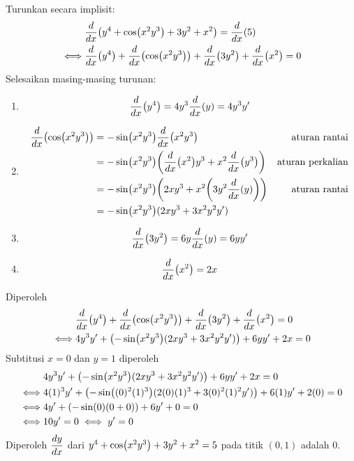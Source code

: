 \begin{enumerate}[leftmargin=*, label={\arabic*}.]
\begin{enumerate}[label={\alph*}.]
    Turunkan secara implisit:
    \begin{align*}
        &\drv{x}{y^{4}+\cos\brk*{x^{2}y^{3}}+3y^{2}+x^{2}}=\drv{x}{5}\\
        \iff &\drv{x}{y^{4}}+\drv{x}{\cos\brk*{x^{2}y^{3}}}
        +\drv{x}{3y^{2}}+\drv{x}{x^{2}} = 0
    \end{align*}
    Selesaikan masing-masing turunan:
        \begin{enumerate}[label={\arabic*})]
        \item \[
        \drv{x}{y^{4}} = 4y^{3}\drv{x}{y} = 4y^{3}y'
        \]
        \item \begin{align*}
            \drv{x}{\cos\brk*{x^{2}y^{3}}} 
            &= -\sin\brk*{x^{2}y^{3}}\drv{x}{x^{2}y^{3}}
            &\text{aturan rantai}\\
            &= -\sin\brk*{x^{2}y^{3}}\brk*{\drv{x}{x^{2}}y^{3}+x^{2}\drv{x}{y^{3}}}
            &\text{aturan perkalian}\\
            &= -\sin\brk*{x^{2}y^{3}}\brk*{2xy^{3}+x^{2}\brk*{3y^{2}\drv{x}{y}}}
            &\text{aturan rantai}\\
            &= -\sin\brk*{x^{2}y^{3}}(2xy^{3}+3x^{2}y^{2}y')
        \end{align*}
        \item \[
        \drv{x}{3y^{2}} = 6y\drv{x}{y} = 6yy'
        \]
        \item \[
        \drv{x}{x^{2}} = 2x
        \]
        \end{enumerate}
    Diperoleh
    \begin{align*}
        &\drv{x}{y^{4}}+\drv{x}{\cos\brk*{x^{2}y^{3}}}
        +\drv{x}{3y^{2}}+\drv{x}{x^{2}} = 0\\
        \iff &4y^{3}y'
        +\brk*{-\sin\brk*{x^{2}y^{3}}(2xy^{3}+3x^{2}y^{2}y')}+6yy'+2x=0
    \end{align*}
    Subtitusi $x=0$ dan $y=1$ diperoleh
    \begin{align*}
        &4y^{3}y'
        +\brk*{-\sin\brk*{x^{2}y^{3}}(2xy^{3}+3x^{2}y^{2}y')}+6yy'+2x=0\\
        \iff &4(1)^{3}y'
        +\brk*{-\sin\brk*{(0)^{2}(1)^{3}}(2(0)(1)^{3}+3(0)^{2}(1)^{2}y')}+6(1)y'
        +2(0)=0\\
        \iff &4y'+(-\sin(0)(0+0))+6y'+0=0 \\
        \iff &10y'=0 \iff y'=0
    \end{align*}
    Diperoleh $\displaystyle\frac{dy}{dx}$ dari 
    $y^{4}+\cos\brk*{x^{2}y^{3}}+3y^{2}+x^{2}=5$ pada titik $(0,1)$ adalah $0$.


\end{enumerate}
\end{enumerate}
